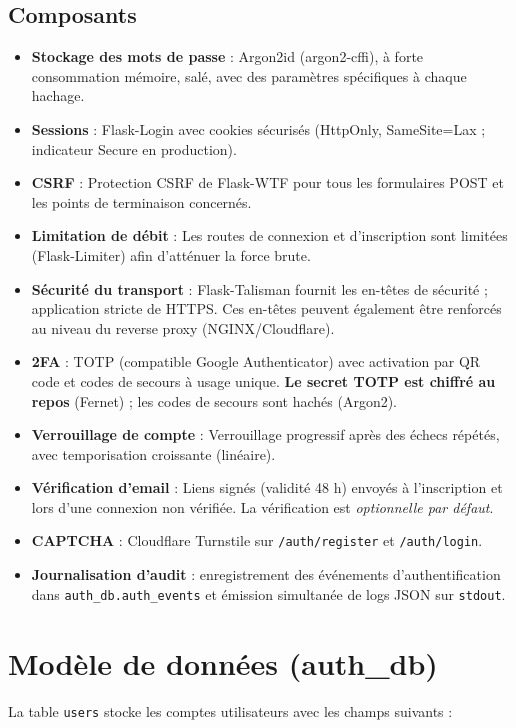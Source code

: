\subsection{Composants}
\begin{itemize}
  \item \textbf{Stockage des mots de passe} : Argon2id (argon2-cffi), à forte consommation mémoire, salé, avec des paramètres spécifiques à chaque hachage.
  \item \textbf{Sessions} : Flask-Login avec cookies sécurisés (HttpOnly, SameSite=Lax ; indicateur Secure en production).
  \item \textbf{CSRF} : Protection CSRF de Flask-WTF pour tous les formulaires POST et les points de terminaison concernés.
  \item \textbf{Limitation de débit} : Les routes de connexion et d'inscription sont limitées (Flask-Limiter) afin d'atténuer la force brute.
  \item \textbf{Sécurité du transport} : Flask-Talisman fournit les en-têtes de sécurité ; application stricte de HTTPS. Ces en-têtes peuvent également être renforcés au niveau du reverse proxy (NGINX/Cloudflare).
  \item \textbf{2FA} : TOTP (compatible Google Authenticator) avec activation par QR code et codes de secours à usage unique. \textbf{Le secret TOTP est chiffré au repos} (Fernet) ; les codes de secours sont hachés (Argon2).
  \item \textbf{Verrouillage de compte} : Verrouillage progressif après des échecs répétés, avec temporisation croissante (linéaire).
  \item \textbf{Vérification d'email} : Liens signés (validité 48 h) envoyés à l'inscription et lors d'une connexion non vérifiée. La vérification est \emph{optionnelle par défaut}.
  \item \textbf{CAPTCHA} : Cloudflare Turnstile sur \texttt{/auth/register} et \texttt{/auth/login}.
  \item \textbf{Journalisation d'audit} : enregistrement des événements d'authentification dans \texttt{auth\_db.auth\_events} et émission simultanée de logs JSON sur \texttt{stdout}.
\end{itemize}

\section{Modèle de données (auth\_db)}
La table \texttt{users} stocke les comptes utilisateurs avec les champs suivants :


